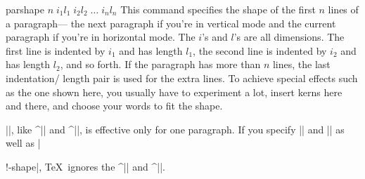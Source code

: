 
\begindesc
\cts parshape {$n\; i_1 l_1\; i_2 l_2\; \ldots \;i_n l_n$}
\explain
This command specifies the shape of the first $n$ lines of a paragraph---
the next paragraph if you're in vertical mode and the current paragraph
if you're in horizontal mode.
The $i$'s and $l$'s are all
dimensions.  The first line is indented by $i_1$ and has length $l_1$,
the second line is indented by $i_2$ and has length $l_2$, and so forth.
If the paragraph has more than $n$ lines, the last indentation\slash
length pair is used for the extra lines.
To achieve special effects such as the one
shown here, you usually have to experiment a lot, insert kerns here and
there, and choose your words to fit the shape.

|\parshape|, like ^|\hangafter| and ^|\hangindent|, is effective only for one
paragraph.
If you specify |\hangafter| and |\hangindent| as well as |\par!-shape|,
\TeX\ ignores the ^|\hangafter| and ^|\hangindent|.
\ifodd\pageno\vfill\eject\fi %

